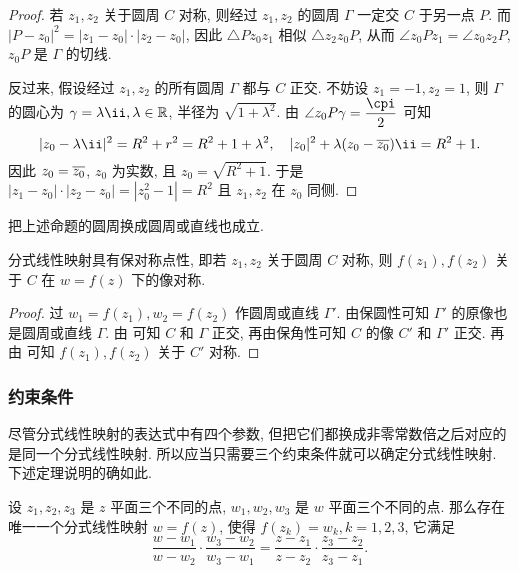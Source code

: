 \begin{proof}
  若 $z_1,z_2$ 关于圆周 $C$ 对称, 则经过 $z_1,z_2$ 的圆周 $\Gamma$ 一定交 $C$ 于另一点 $P$.
  而 $|P-z_0|^2=|z_1-z_0|\cdot|z_2-z_0|$, 因此 $\triangle Pz_0z_1$ 相似 $\triangle z_2z_0P$, 从而 $\angle z_0Pz_1=\angle z_0z_2P$, $z_0P$ 是 $\Gamma$ 的切线.

  反过来, 假设经过 $z_1,z_2$ 的所有圆周 $\Gamma$ 都与 $C$ 正交.
  不妨设 $z_1=-1,z_2=1$, 则 $\Gamma$ 的圆心为 $\gamma=\lambda\ii,\lambda\in\BR$, 半径为 $\sqrt{1+\lambda^2}$.
  由 $\angle z_0 P\gamma=\dfrac\cpi2$ 可知
  \[
     |z_0-\lambda\ii|^2
    =R^2+r^2
    =R^2+1+\lambda^2,\quad
     |z_0|^2+\lambda(z_0-\ov{z_0})\ii
    =R^2+1.
  \]
  因此 $z_0=\overline{z_0}$, $z_0$ 为实数, 且 $z_0=\sqrt{R^2+1}$.
  于是 $|z_1-z_0|\cdot|z_2-z_0|=|z_0^2-1|=R^2$ 且 $z_1,z_2$ 在 $z_0$ 同侧.
\end{proof}

把上述命题的圆周换成圆周或直线也成立.

\begin{theorem}
  分式线性映射具有保对称点性, 即若 $z_1,z_2$ 关于圆周 $C$ 对称, 则 $f(z_1),f(z_2)$ 关于 $C$ 在 $w=f(z)$ 下的像对称.
\end{theorem}

\begin{proof}
  过 $w_1=f(z_1),w_2=f(z_2)$ 作圆周或直线 $\Gamma'$.
  由保圆性可知 $\Gamma'$ 的原像也是圆周或直线 $\Gamma$.
  由 可知 $C$ 和 $\Gamma$ 正交, 再由保角性可知 $C$ 的像 $C'$ 和 $\Gamma'$ 正交.
  再由 可知 $f(z_1),f(z_2)$ 关于 $C'$ 对称.
\end{proof}


\subsubsection{约束条件}

尽管分式线性映射的表达式中有四个参数, 但把它们都换成非零常数倍之后对应的是同一个分式线性映射.
所以应当只需要三个约束条件就可以确定分式线性映射.
下述定理说明的确如此.

\begin{theorem}
  \label{thm:three-points-determine-fractal-transform}
  设 $z_1,z_2,z_3$ 是 $z$ 平面三个不同的点, $w_1,w_2,w_3$ 是 $w$ 平面三个不同的点.
  那么存在唯一一个分式线性映射 $w=f(z)$, 使得 $f(z_k)=w_k,k=1,2,3$, 它满足
  \[
     \frac{w-w_1}{w-w_2}\cdot\frac{w_3-w_2}{w_3-w_1}
    =\frac{z-z_1}{z-z_2}\cdot\frac{z_3-z_2}{z_3-z_1}.
  \]
\end{theorem}

